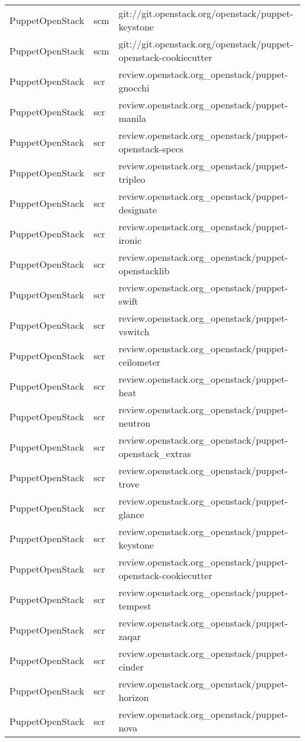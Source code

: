 \begin{center}
\begin{longtable}{|p{4cm}|p{1cm}|p{10cm}|}
PuppetOpenStack&scm&git://git.openstack.org/openstack/puppet-keystone\\ 
PuppetOpenStack&scm&git://git.openstack.org/openstack/puppet-openstack-cookiecutter\\ 
PuppetOpenStack&scr&review.openstack.org\_openstack/puppet-gnocchi\\ 
PuppetOpenStack&scr&review.openstack.org\_openstack/puppet-manila\\ 
PuppetOpenStack&scr&review.openstack.org\_openstack/puppet-openstack-specs\\ 
PuppetOpenStack&scr&review.openstack.org\_openstack/puppet-tripleo\\ 
PuppetOpenStack&scr&review.openstack.org\_openstack/puppet-designate\\ 
PuppetOpenStack&scr&review.openstack.org\_openstack/puppet-ironic\\ 
PuppetOpenStack&scr&review.openstack.org\_openstack/puppet-openstacklib\\ 
PuppetOpenStack&scr&review.openstack.org\_openstack/puppet-swift\\ 
PuppetOpenStack&scr&review.openstack.org\_openstack/puppet-vswitch\\ 
PuppetOpenStack&scr&review.openstack.org\_openstack/puppet-ceilometer\\ 
PuppetOpenStack&scr&review.openstack.org\_openstack/puppet-heat\\ 
PuppetOpenStack&scr&review.openstack.org\_openstack/puppet-neutron\\ 
PuppetOpenStack&scr&review.openstack.org\_openstack/puppet-openstack\_extras\\ 
PuppetOpenStack&scr&review.openstack.org\_openstack/puppet-trove\\ 
PuppetOpenStack&scr&review.openstack.org\_openstack/puppet-glance\\ 
PuppetOpenStack&scr&review.openstack.org\_openstack/puppet-keystone\\ 
PuppetOpenStack&scr&review.openstack.org\_openstack/puppet-openstack-cookiecutter\\ 
PuppetOpenStack&scr&review.openstack.org\_openstack/puppet-tempest\\ 
PuppetOpenStack&scr&review.openstack.org\_openstack/puppet-zaqar\\ 
PuppetOpenStack&scr&review.openstack.org\_openstack/puppet-cinder\\ 
PuppetOpenStack&scr&review.openstack.org\_openstack/puppet-horizon\\ 
PuppetOpenStack&scr&review.openstack.org\_openstack/puppet-nova\\ 

\end{longtable}
\end{center}

